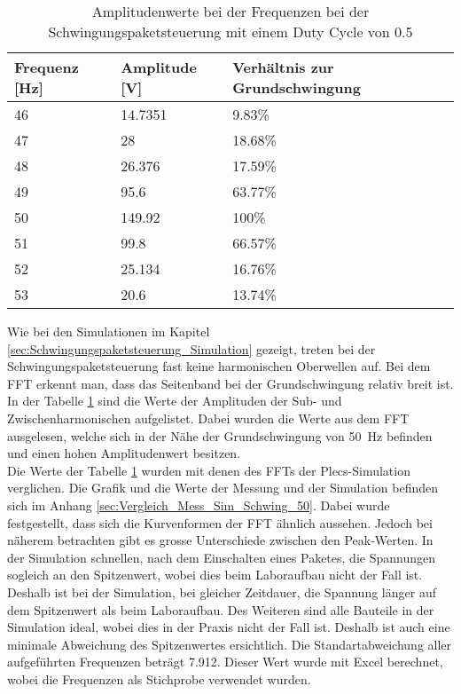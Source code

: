 \newpage
\begin{table}[ht!]
	\centering
	\begin{tabular}{|l|l|l|}
		\hline
		Frequenz {[}Hz{]} & Amplitude {[}V{]} & Verhältnis zur Grundschwingung \\ \hline
		46                & 14.7351           & 9.83\%                         \\ \hline
		47                & 28                & 18.68\%                        \\ \hline
		48                & 26.376            & 17.59\%                        \\ \hline
		49                & 95.6              & 63.77\%                        \\ \hline
		50                & 149.92            & 100\%                          \\ \hline
		51                & 99.8              & 66.57\%                        \\ \hline
		52                & 25.134            & 16.76\%                        \\ \hline
		53                & 20.6              & 13.74\%                        \\ \hline
	\end{tabular}
\caption{Amplitudenwerte bei der Frequenzen bei der Schwingungspaketsteuerung mit einem Duty Cycle von 0.5}\label{tab:Mess_Spannung_Schwing_50}
\end{table}

Wie bei den Simulationen im Kapitel \ref{sec:Schwingungspaketsteuerung_Simulation} gezeigt, treten bei der Schwingungspaketsteuerung fast keine harmonischen Oberwellen auf. Bei dem FFT erkennt man, dass das Seitenband bei der Grundschwingung relativ breit ist. In der Tabelle \ref{tab:Mess_Spannung_Schwing_50} sind die Werte der Amplituden der Sub- und Zwischenharmonischen aufgelistet. Dabei wurden die Werte aus dem FFT ausgelesen, welche sich in der Nähe der Grundschwingung von \SI{50}{Hz} befinden und einen hohen Amplitudenwert besitzen. \\
Die Werte der Tabelle \ref{tab:Mess_Spannung_Schwing_50} wurden mit denen des FFTs der Plecs-Simulation verglichen. Die Grafik und die Werte der Messung und der Simulation befinden sich im Anhang \ref{sec:Vergleich_Mess_Sim_Schwing_50}. Dabei wurde festgestellt, dass sich die Kurvenformen der FFT ähnlich aussehen. Jedoch bei näherem betrachten gibt es grosse Unterschiede zwischen den Peak-Werten. In der Simulation schnellen, nach dem Einschalten eines Paketes, die Spannungen sogleich an den Spitzenwert, wobei dies beim Laboraufbau nicht der Fall ist. Deshalb ist bei der Simulation, bei gleicher Zeitdauer, die Spannung länger auf dem Spitzenwert als beim Laboraufbau. Des Weiteren sind alle Bauteile in der Simulation ideal, wobei dies in der Praxis nicht der Fall ist. Deshalb ist auch eine minimale Abweichung des Spitzenwertes ersichtlich. Die Standartabweichung aller aufgeführten Frequenzen beträgt 7.912. Dieser Wert wurde mit Excel berechnet, wobei die Frequenzen als Stichprobe verwendet wurden. 



